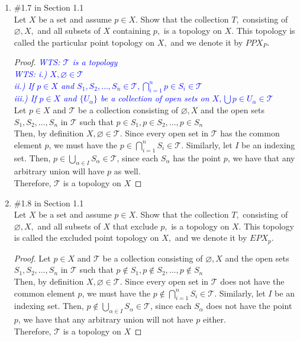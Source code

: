 \documentclass[12pt]{article}
\newcommand{\TT}{\mathcal{T}}
\newcommand{\wts}[1]{\textit{\textcolor{blue}{WTS: #1}}\\}
\begin{document}
\begin{enumerate}
\item \#1.7 in Section 1.1\\
Let $X$ be a set and assume $p \in X .$ Show that the collection $T,$ consisting of
$\varnothing, X,$ and all subsets of $X$ containing $p,$ is a topology on $X .$ This topology is called the particular point topology on $X,$ and we denote it by $P P X_{P} .$
\begin{proof}
	\wts{$\TT$ is a topology}
	\wts{i.) $ X,\varnothing \in \TT $\\
		 ii.) If  $p\in X$ and $ S_1, S_2, \ldots, S_n \in \TT, \bigcap_{i=1}^n  p\in S_i\in \TT$ \\
		iii.) If $ p\in X $ and $\{U_\alpha\}$ be a collection of open sets on $ X, \bigcup p\in U_\alpha \in \TT$ 
 	}
 	Let $ p\in X $ and $ \TT $ be a collection consisting of $ \varnothing,X $ and the open sets $S_1, S_2, \ldots, S_n$ in $ \TT $ such that $ p\in S_1, p\in S_2, \ldots, p\in S_n $\\
 	 Then, by definition $ X,\varnothing\in\TT $. Since every open set in $ \TT $ has the common element $ p $, we must have the $ p\in\bigcap_{i=1}^n S_i \in \TT $. Similarly, let $ I $ be an indexing set. Then, $p\in\bigcup_{\alpha\in I} S_\alpha \in \TT$, since each $ S_\alpha $ has the point $ p $, we have that any arbitrary union will have $ p $ as well. \\
 	 Therefore, $ \TT $ is a topology on $ X $
\end{proof}
\item \#1.8 in Section 1.1\\
Let $X$ be a set and assume $p \in X .$ Show that the collection $T,$ consisting of
$\varnothing, X,$ and all subsets of $X$ that exclude $p,$ is a topology on $X .$ This topology is called the excluded point topology on $X,$ and we denote it by $E P X_{p}$.
\begin{proof}
		Let $ p\in X $ and $ \TT $ be a collection consisting of $ \varnothing,X $ and the open sets $S_1, S_2, \ldots, S_n$ in $ \TT $ such that $ p\not\in S_1, p\not\in S_2, \ldots, p\not\in S_n $\\
	Then, by definition $ X,\varnothing\in\TT $. Since every open set in $ \TT $ does not have the common element $ p $, we must have the $ p\not\in\bigcap_{i=1}^n S_i \in \TT $. Similarly, let $ I $ be an indexing set. Then, $p\not\in\bigcup_{\alpha\in I} S_\alpha \in \TT$, since each $ S_\alpha $ does not have the point $ p $, we have that any arbitrary union will not have $ p $ either. \\
	Therefore, $ \TT $ is a topology on $ X $

\end{proof}
\end{enumerate}
\end{document}
